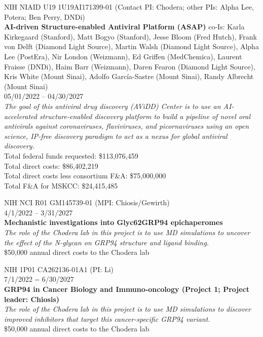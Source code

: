 \documentclass[10pt]{article}
\begin{document}
NIH NIAID U19 1U19AI171399-01 (Contact PI: Chodera; other PIs: Alpha Lee, Potera; Ben Perry, DNDi) \\
{\bf AI-driven Structure-enabled Antiviral Platform (ASAP)}
co-Is: Karla Kirkegaard (Stanford), Matt Bogyo (Stanford), Jesse Bloom (Fred Hutch), Frank von Delft (Diamond Light Source), Martin Walsh (Diamond Light Source), Alpha Lee (PostEra), Nir London (Weizmann), Ed Griffen (MedChemica), Laurent Fraisse (DNDi), Haim Barr (Weizmann), Daren Fearon (Diamond Light Source), Kris White (Mount Sinai), Adolfo Garc\'{i}a-Sastre (Mount Sinai), Randy Albrecht (Mount Sinai) \\
05/01/2022 -- 04/30/2027\\
\emph{The goal of this antiviral drug discovery (AViDD) Center is to use an AI-accelerated structure-enabled discovery platform to build a pipeline of novel oral antivirals against coronaviruses, flaviviruses, and picornaviruses using an open science, IP-free discovery paradigm to act as a nexus for global antiviral discovery.}\\
Total federal funds requested: \$113,076,459\\
Total direct costs: \$86,402,219\\
Total direct costs less consortium F\&A: \$75,000,000\\
Total F\&A for MSKCC: \$24,415,485

\vspace{1.5ex}

NIH NCI R01 GM145739‑01 (MPI: Chiosis/Gewirth)\\
4/1/2022 -- 3/31/2027\\
{\bf Mechanistic investigations into Glyc62GRP94 epichaperomes}\\
\emph{The role of the Chodera lab in this project is to use MD simulations to uncover the effect of the N-glycan on GRP94 structure and ligand binding.}\\
\$50,000 annual direct costs to the Chodera lab

\vspace{1.5ex}

NIH 1P01 CA262136-01A1 (PI: Li) \\
7/1/2022 ‑- 6/30/2027\\
{\bf GRP94 in Cancer Biology and Immuno‑oncology (Project 1; Project leader: Chiosis)}\\
\emph{The role of the Chodera lab in this project is to use MD simulations to discover improved inhibitors that target this cancer-specific GRP94 variant.}\\
\$50,000 annual direct costs to the Chodera lab
\end{document}
